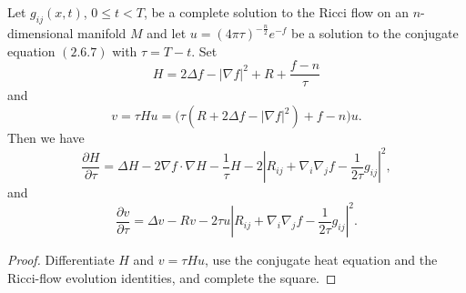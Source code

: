\begin{lemma}
  \label{lem:cz-gradient-estimate-for-conjugate-heat-equations}
Let $g_{ij}(x,t)$, $0 \leq t < T$, be a complete solution to the
Ricci flow on an $n$-dimensional manifold $M$ and let $u=(4 \pi
\tau)^{-\frac{n}{2}} e^{-f}$ be a solution to the conjugate
equation $(2.6.7)$ with $\tau=T-t$. Set
$$
H=2 \Delta f -| \nabla f |^2 + R + \frac{f-n}{\tau}
$$
and
$$
v = \tau H u = \big(\tau(R+2 \Delta f - | \nabla f|^2)+f-n \big)
u.
$$
Then we have
$$
\frac{\partial H}{\partial \tau} = \Delta H - 2 \nabla f \cdot
\nabla H - \frac{1}{\tau} H - 2 \left| R_{ij} + \nabla_i\nabla_j f
- \frac{1}{2 \tau} g_{ij} \right|^2,
$$
and
$$
\frac{\partial v}{\partial \tau} = \Delta v - Rv - 2 \tau u
\left|R_{ij}+\nabla_i\nabla_jf - \frac{1}{2 \tau} g_{ij}\right|^2.
$$
\end{lemma}

\begin{proof}
  \sketch Differentiate $H$ and $v=\tau Hu$, use the conjugate heat equation and the Ricci-flow evolution identities, and complete the square.
\end{proof}
